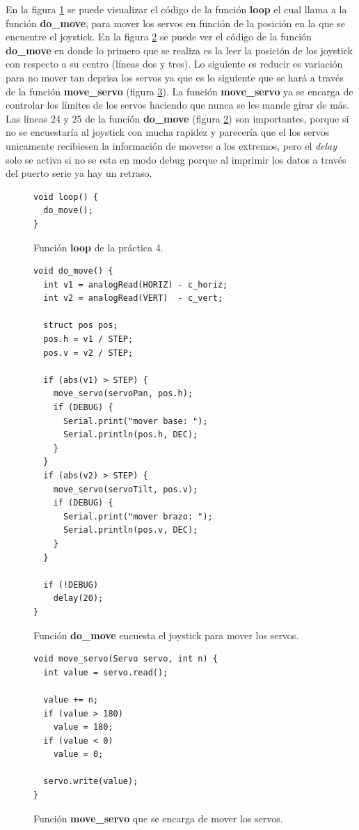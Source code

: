 \documentclass{article}
\begin{document}
	En la figura \ref{cod:p4:loop} se puede visualizar el código de la función \textbf{loop} el cual llama a la función \textbf{do\_move}, para mover los servos en función de la posición en la que se encuentre el joystick. En la figura \ref{cod:p4:do_move} se puede ver el código de la función \textbf{do\_move} en donde lo primero que se realiza es la leer la posición de los joystick con respecto a su centro (líneas dos y tres). Lo siguiente es reducir es variación para no mover tan deprisa los servos ya que es lo siguiente que se hará a través de la función \textbf{move\_servo} (figura \ref{cod:p4:move_servo}). La función \textbf{move\_servo} ya se encarga de controlar los límites de los servos haciendo que nunca se les mande girar de más. Las líneas 24 y 25 de la función \textbf{do\_move} (figura \ref{cod:p4:do_move}) son importantes, porque si no se encuestaría al joystick con mucha rapidez y parecería que el los servos unicamente recibiesen la información de moverse a los extremos, pero el \textit{delay} solo se activa si no se esta en modo debug porque al imprimir los datos a través del puerto serie ya hay un retraso.
	
\begin{figure}[h]
	\begin{lstlisting}[style=c]
void loop() { 
  do_move();
}
	\end{lstlisting}
	\caption{Función \textbf{loop} de la práctica 4.}
	\label{cod:p4:loop}
\end{figure}

\begin{figure}[h]
	\begin{lstlisting}[style=c]
void do_move() {
  int v1 = analogRead(HORIZ) - c_horiz;
  int v2 = analogRead(VERT)  - c_vert;
  
  struct pos pos;
  pos.h = v1 / STEP;
  pos.v = v2 / STEP;
  
  if (abs(v1) > STEP) {
    move_servo(servoPan, pos.h);
    if (DEBUG) {
      Serial.print("mover base: ");
      Serial.println(pos.h, DEC);
    }
  }
  if (abs(v2) > STEP) {
    move_servo(servoTilt, pos.v);
    if (DEBUG) {
      Serial.print("mover brazo: ");
      Serial.println(pos.v, DEC);
    }
  }
  
  if (!DEBUG)
    delay(20);
}
	\end{lstlisting}
	\caption{Función \textbf{do\_move} encuesta el joystick para mover los servos.}
	\label{cod:p4:do_move}
\end{figure}

\begin{figure}[h]
	\begin{lstlisting}[style=c]
void move_servo(Servo servo, int n) {
  int value = servo.read();
 
  value += n;
  if (value > 180)
    value = 180;
  if (value < 0)
    value = 0;

  servo.write(value);
}
	\end{lstlisting}
	\caption{Función \textbf{move\_servo} que se encarga de mover los servos.}
	\label{cod:p4:move_servo}
\end{figure}
\end{document}
